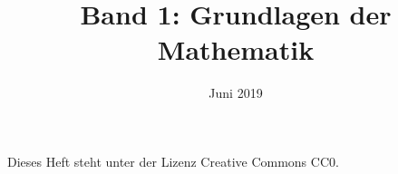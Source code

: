 \documentclass[a4paper,fleqn,11pt]{scrbook}
\title{Band 1: Grundlagen der Mathematik}
\date{Juni 2019}
\theoremstyle{rmbox}
\numberwithin{Definition}{chapter}
\numberwithin{Satz}{chapter}
\begin{document}
\thispagestyle{empty}

\maketitle

Dieses Heft steht unter der Lizenz Creative Commons CC0.

\tableofcontents





\printindex
\end{document}
